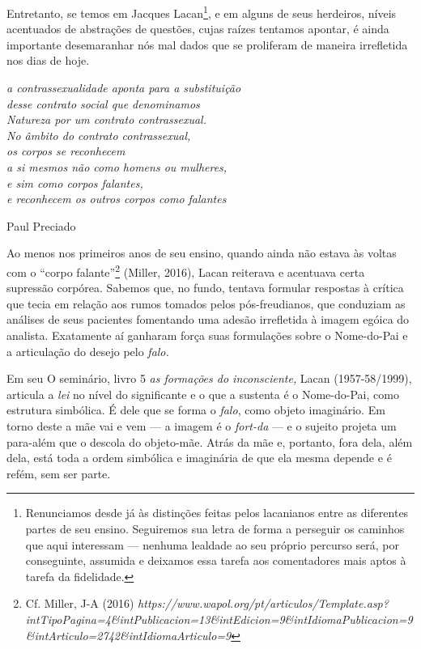 Entretanto, se temos em Jacques Lacan\footnote{Renunciamos desde já às
  distinções feitas pelos lacanianos entre as diferentes partes de seu
  ensino. Seguiremos sua letra de forma a perseguir os caminhos que aqui
  interessam --- nenhuma lealdade ao seu próprio percurso será, por
  conseguinte, assumida e deixamos essa tarefa aos comentadores mais
  aptos à tarefa da fidelidade.}, e em alguns de seus herdeiros, níveis
acentuados de abstrações de questões, cujas raízes tentamos apontar, é
ainda importante desemaranhar nós mal dados que se proliferam de maneira
irrefletida nos dias de hoje.

\asterisc

\epigraph{\emph{a contrassexualidade aponta para a substituição\\
desse contrato social que denominamos\\
Natureza por um contrato contrassexual.\\
No âmbito do contrato contrassexual,\\
os corpos se reconhecem\\
a si mesmos não como homens ou mulheres,\\
e sim como corpos falantes,\\
e reconhecem os outros corpos como falantes}}{Paul Preciado}

Ao menos nos primeiros anos de seu ensino, quando ainda não estava às
voltas com o ``corpo falante''\footnote{Cf. Miller, J-A (2016)
  \emph{https://www.wapol.org/pt/articulos/Template.asp?intTipoPagina=4\&intPublicacion=13\&intEdicion=9\&intIdiomaPublicacion=9\&intArticulo=2742\&intIdiomaArticulo=9}}
(Miller, 2016), Lacan reiterava e acentuava certa supressão corpórea.
Sabemos que, no fundo, tentava formular respostas à crítica que tecia em
relação aos rumos tomados pelos pós-freudianos, que conduziam as
análises de seus pacientes fomentando uma adesão irrefletida à imagem
egóica do analista. Exatamente aí ganharam força suas formulações sobre
o Nome-do-Pai e a articulação do desejo pelo \emph{falo. }

Em seu O seminário, livro 5 \emph{as formações do inconsciente,} Lacan
(1957-58/1999), articula a \emph{lei} no nível do significante e o que a
sustenta é o Nome-do-Pai, como estrutura simbólica. É dele que se forma
o \emph{falo}, como objeto imaginário. Em torno deste a mãe vai e vem ---
a imagem é o \emph{fort-da} --- e o sujeito projeta um para-além que o
descola do objeto-mãe. Atrás da mãe e, portanto, fora dela, além dela,
está toda a ordem simbólica e imaginária de que ela mesma depende e é
refém, sem ser parte.

